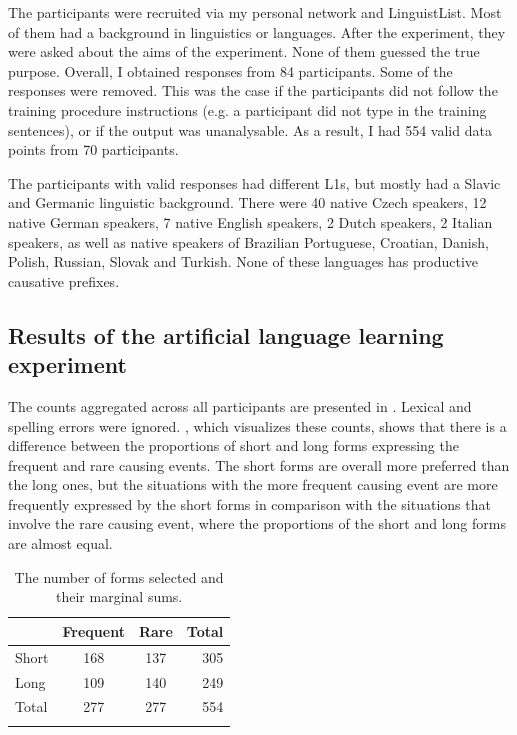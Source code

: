 \documentclass[output=paper]{langsci/langscibook}
\begin{document}
The participants were recruited via my personal network and LinguistList. Most of them had a background in linguistics or languages. After the experiment, they were asked about the aims of the experiment. None of them guessed the true purpose. Overall, I obtained responses from 84 participants. Some of the responses were removed. This was the case if the participants did not follow the training procedure instructions (e.g. a participant did not type in the training sentences), or if the output was unanalysable. As a result, I had 554 valid data points from 70 participants. 

The participants with valid responses had different L1s, but mostly had a Slavic and Germanic linguistic background. There were 40 native Czech speakers, 12 native German speakers, 7 native English speakers, 2 Dutch speakers, 2 Italian speakers, as well as native speakers of Brazilian Portuguese, Croatian, Danish, Polish, Russian, Slovak and Turkish. None of these languages has productive causative prefixes.

\subsection{Results of the artificial language learning experiment}

The counts aggregated across all participants are presented in . Lexical and spelling errors were ignored. , which visualizes these counts, shows that there is a difference between the proportions of short and long forms expressing the frequent and rare causing events. The short forms are overall more preferred than the long ones, but the situations with the more frequent causing event are more frequently expressed by the short forms in comparison with the situations that involve the rare causing event, where the proportions of the short and long forms are almost equal.

\begin{table}
\begin{tabularx}{.8\textwidth}{XSS@{\qquad\qquad}r} 
\lsptoprule
& Frequent & Rare &  {Total}\\
\midrule
Short & 168 & 137 &  {305}\\
Long & 109 & 140 &  {249}\\
\midrule 
 {Total} &  {277} &  {277} &  {554}\\
\lspbottomrule
\end{tabularx} 
\caption{The number of forms selected and their marginal sums.}
\label{tab:levshina:1}
\end{table}
\end{document}
